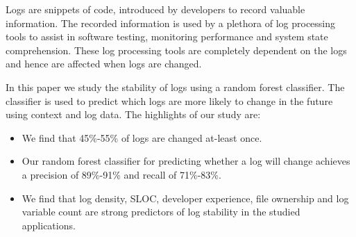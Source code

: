 Logs are snippets of code, introduced by developers to record valuable information. The recorded information is used by a plethora of log processing tools to assist in software testing, monitoring performance and system state comprehension. These log processing tools are completely dependent on the logs and hence are affected when logs are changed.

 In this paper we study the stability of logs using a random forest classifier. The classifier is used to predict which logs are more likely to change in the future using context and log data.  The highlights of our study are:

\begin{itemize}
	\item We find that 45\%-55\% of logs are changed at-least once.
	\item Our random forest classifier for predicting whether a log will change achieves a precision of 89\%-91\% and recall of 71\%-83\%. 
	\item We find that log density, SLOC, developer experience, file ownership and log variable count are strong predictors of log stability in the studied applications.  	
	
\end{itemize}




